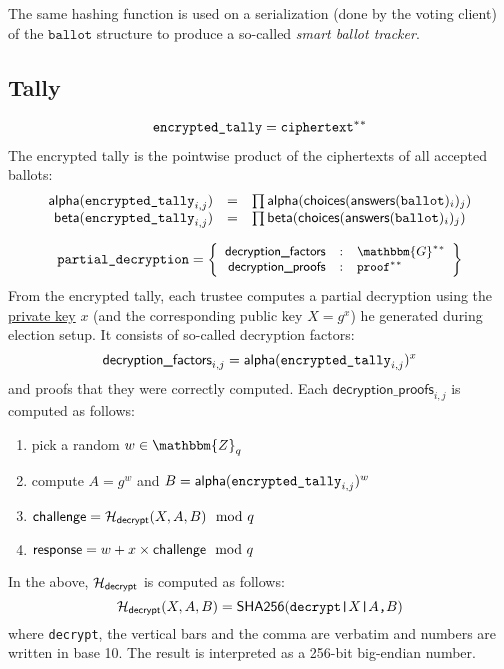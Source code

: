 \documentclass[a4paper]{article}
\newcommand{\G}{\mathbbm{G}}
\newcommand{\Z}{\mathbbm{Z}}
\newcommand{\shatwo}{\textsf{SHA256}}
\newcommand{\ballot}{\texttt{ballot}}
\newcommand{\etally}{\texttt{encrypted\_tally}}
\newcommand{\pdecryption}{\texttt{partial\_decryption}}
\begin{document}
The same hashing function is used on a serialization (done by the
voting client) of the $\ballot$ structure to produce a so-called
\emph{smart ballot tracker}.

\subsection{Tally}
\label{tally}

\begin{gather*}
  \etally=\ciphertext^\ast{}^\ast
\end{gather*}
The encrypted tally is the pointwise product of the ciphertexts of all
accepted ballots:
\[
\begin{array}{rcl}
\alphalabel(\etally_{i,j})&=&\prod\alphalabel(\choices(\answers(\ballot)_i)_j)\\
\betalabel(\etally_{i,j})&=&\prod\betalabel(\choices(\answers(\ballot)_i)_j)
\end{array}
\]

\newcommand{\dfactors}{\textsf{decryption\_factors}}
\newcommand{\dproofs}{\textsf{decryption\_proofs}}
\newcommand{\decrypt}{\textsf{decrypt}}

\begin{gather*}
  \pdecryption=\left\{\small
    \begin{array}{rcl}
      \dfactors&:&\G^\ast{}^\ast\\
      \dproofs&:&\proof^\ast{}^\ast
    \end{array}
  \right\}
\end{gather*}
From the encrypted tally, each trustee computes a partial decryption
using the \hyperref[trustee-keys]{private key} $x$ (and the
corresponding public key $X=g^x$) he generated during election
setup. It consists of so-called decryption factors:
\[
\dfactors_{i,j}=\alphalabel(\etally_{i,j})^x
\]
and proofs that they were correctly computed. Each $\dproofs_{i,j}$ is
computed as follows:
\begin{enumerate}
\item pick a random $w\in\Z_q$
\item compute $A=g^w$ and $B=\alphalabel(\etally_{i,j})^w$
\item $\challenge=\Hash_\decrypt(X,A,B)\mod q$
\item $\textsf{response}=w+x\times\textsf{challenge}\mod q$
\end{enumerate}
In the above, $\Hash_\decrypt$ is computed as follows:
\[
\Hash_\decrypt(X,A,B)=\shatwo(\verb=decrypt|=X\verb=|=A\verb=,=B)
\]
where \verb=decrypt=, the vertical bars and the comma are verbatim and
numbers are written in base 10. The result is interpreted as a 256-bit
big-endian number.
\end{document}
